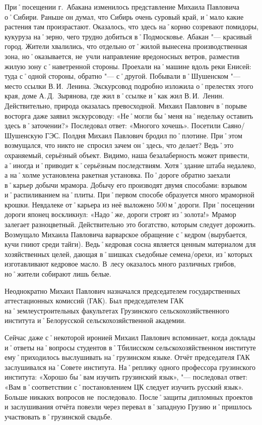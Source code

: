 При˚посещении г.~Абакана изменилось представление Михаила Павловича о˚Сибири. Раньше он думал, что Сибирь очень суровый край, и˚мало какие растения там произрастают. Оказалось, что здесь на˚корню созревают помидоры, кукуруза на˚зерно, чего трудно добиться в˚Подмосковье. Абакан "--- красивый город. Жители хвалились, что отдельно от˚жилой вынесена производственная зона, но˚оказывается, не~учли направление вредоносных ветров, разместив жилую зону с˚наветренной стороны. Проехали на˚машине вдоль реки Енисей: туда с˚одной стороны, обратно "--- с˚другой. Побывали в˚Шушенском "--- место ссылки В.\,И.~Ленина. Экскурсовод подробно изложила о˚прелестях этого края, доме А.\,Д.~Зырянова, где жил в˚ссылке и˚как жил В.\,И.~Ленин. Действительно, природа оказалась превосходной. Михаил Павлович в˚порыве восторга даже заявил экскурсоводу: «Не˚могли бы˚меня на˚недельку оставить здесь в˚заточении?» Последовал ответ: «Многого хочешь». Посетили Саяно\-/Шушенскую ГЭС. Полдня Михаил Павлович бродил по˚плотине. При˚этом возмущался, что никто не~спросил зачем он˚здесь, что делает? Ведь˚это охраняемый, серьёзный объект. Видимо, наша безалаберность может привести, а˚иногда и˚приводит к˚серьёзным последствиям. Хотя˚здание штаба недалеко, а на˚холме установлена ракетная установка. По˚дороге обратно заехали в˚карьер добычи мрамора. Добычу его производят двумя способами: взрывом и˚распиливанием на˚плиты. При˚первом способе образуется много мраморной крошки. Невдалеке от˚карьера из неё выложено 500\,м˚дороги. При˚посещении дороги японец воскликнул: «Надо˚же, дороги строят из˚золота!» Мрамор залегает разноцветный. Действительно это богатство, которым следует дорожить. Возмущало Михаила Павловича варварское обращение с˚кедром (вырубается, кучи гниют среди тайги). Ведь˚кедровая сосна является ценным материалом для хозяйственных целей, дающая в˚шишках съедобные семена\-/орехи, из˚которых изготавливают кедровое масло. В~лесу оказалось много различных грибов, но˚жители собирают лишь белые.

Неоднократно Михаил Павлович назначался председателем государственных аттестационных комиссий (ГАК). Был председателем ГАК на˚землеустроительных факультетах Грузинского сельскохозяйственного института и˚Белорусской сельскохозяйственной академии. 

Сейчас даже с˚некоторой иронией Михаил Павлович вспоминает, когда доклады и˚ответы на˚вопросы студентов в˚Тбилисском сельскохозяйственном институте ему˚приходилось выслушивать на˚грузинском языке. Отчёт председателя ГАК заслушивался на˚Совете института. На˚реплику одного профессора грузинского института: «Хорошо бы˚вам изучить грузинский язык», "--- последовал ответ: «Вам в˚соответствии с˚постановлением ЦК следует изучить русский язык». Больше никаких вопросов не~последовало. После˚защиты дипломных проектов и заслушивания отчёта повезли через перевал в˚западную Грузию и˚пришлось участвовать в˚грузинской свадьбе.

